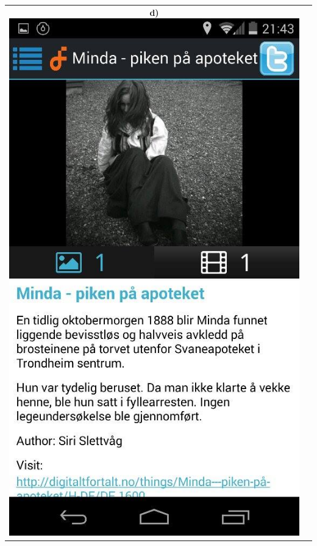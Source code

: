 \documentclass[12pt,a4paper,titlepage]{article}
\begin{document}
\begin{center}
\begin{tabular}{cc}
	 	\textbf{d)\hspace{0.2in}}\includegraphics[width=0.35 \textwidth]{res/ScreenShot4.jpg}\\
\end{tabular}
\end{center}
\end{document}
